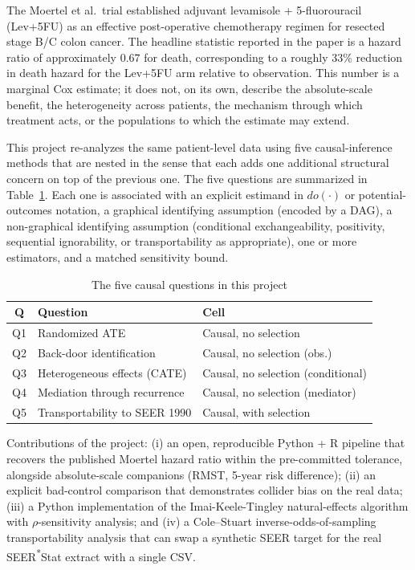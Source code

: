 \documentclass[conference]{IEEEtran}
\begin{document}
The Moertel et al.\ trial \cite{moertel1990} established adjuvant levamisole + 5-fluorouracil (Lev+5FU) as an effective post-operative chemotherapy regimen for resected stage B/C colon cancer. The headline statistic reported in the paper is a hazard ratio of approximately $0.67$ for death, corresponding to a roughly 33\% reduction in death hazard for the Lev+5FU arm relative to observation. This number is a marginal Cox estimate; it does not, on its own, describe the absolute-scale benefit, the heterogeneity across patients, the mechanism through which treatment acts, or the populations to which the estimate may extend.

This project re-analyzes the same patient-level data using five causal-inference methods that are nested in the sense that each adds one additional structural concern on top of the previous one. The five questions are summarized in Table~\ref{tab:questions}. Each one is associated with an explicit estimand in $do(\cdot)$ or potential-outcomes notation, a graphical identifying assumption (encoded by a DAG), a non-graphical identifying assumption (conditional exchangeability, positivity, sequential ignorability, or transportability as appropriate), one or more estimators, and a matched sensitivity bound.

\begin{table}[t]
\caption{The five causal questions in this project}
\label{tab:questions}
\centering
\renewcommand{\arraystretch}{1.15}
\begin{tabular}{@{}clp{3.6cm}@{}}
\toprule
\textbf{Q} & \textbf{Question} & \textbf{Cell} \\
\midrule
Q1 & Randomized ATE                & Causal, no selection \\
Q2 & Back-door identification      & Causal, no selection (obs.) \\
Q3 & Heterogeneous effects (CATE)  & Causal, no selection (conditional) \\
Q4 & Mediation through recurrence  & Causal, no selection (mediator) \\
Q5 & Transportability to SEER 1990 & Causal, with selection \\
\bottomrule
\end{tabular}
\end{table}

Contributions of the project: (i) an open, reproducible Python + R pipeline that recovers the published Moertel hazard ratio within the pre-committed tolerance, alongside absolute-scale companions (RMST, 5-year risk difference); (ii) an explicit bad-control comparison that demonstrates collider bias on the real data; (iii) a Python implementation of the Imai-Keele-Tingley natural-effects algorithm with $\rho$-sensitivity analysis; and (iv) a Cole--Stuart inverse-odds-of-sampling transportability analysis that can swap a synthetic SEER target for the real SEER\textsuperscript{*}Stat extract with a single CSV.
\end{document}
